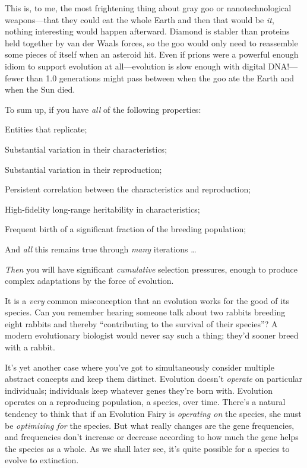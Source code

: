 {
 This is, to me, the most frightening thing about gray goo or
nanotechnological weapons---that they could eat the whole Earth and
then that would be \textit{it}, nothing interesting would happen
afterward. Diamond is stabler than proteins held together by van der
Waals forces, so the goo would only need to reassemble some pieces of
itself when an asteroid hit. Even if prions were a powerful enough
idiom to support evolution at all---evolution is slow enough with
digital DNA!---fewer than 1.0 generations might pass between when the
goo ate the Earth and when the Sun died.}

{
 To sum up, if you have \textit{all} of the following properties:}

{
 Entities that replicate;}

{
 Substantial variation in their characteristics;}

{
 Substantial variation in their reproduction;}

{
 Persistent correlation between the characteristics and
reproduction;}

{
 High-fidelity long-range heritability in characteristics;}

{
 Frequent birth of a significant fraction of the breeding
population;}

{
 And \textit{all} this remains true through \textit{many}
iterations \ldots}

{
 \textit{Then} you will have significant \textit{cumulative}
selection pressures, enough to produce complex adaptations by the force
of evolution.}

\myendsectiontext


{
 It is a \textit{very} common misconception that an evolution works
for the good of its species. Can you remember hearing someone talk
about two rabbits breeding eight rabbits and thereby
``contributing to the survival of their
species''? A modern evolutionary biologist would
never say such a thing; they'd sooner breed with a
rabbit. }

{
 It's yet another case where you've
got to simultaneously consider multiple abstract concepts and keep them
distinct. Evolution doesn't \textit{operate} on
particular individuals; individuals keep whatever genes
they're born with. Evolution operates on a reproducing
population, a species, over time. There's a natural
tendency to think that if an Evolution Fairy is \textit{operating on}
the species, she must be \textit{optimizing for} the species. But what
really changes are the gene frequencies, and frequencies
don't increase or decrease according to how much the
gene helps the species as a whole. As we shall later see,
it's quite possible for a species to evolve to
extinction.}

